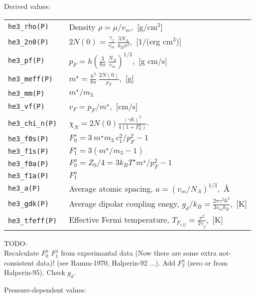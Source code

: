 \documentclass[a4paper]{article}
\begin{document}
Derived values:

\medskip
\noindent\begin{tabular}{lp{11cm}}
\tt he3\_rho(P)    & Density $\rho = \mu/v_m$,~[g/cm$^3$]\\
\tt he3\_2n0(P)    & $\displaystyle 2N(0) = \frac{\gamma_f}{v_m}
                     \ \frac{3 N_A}{k_B \pi^2}$,~[1/(erg cm$^3$)]\\[3mm]
\tt he3\_pf(P)     & $\displaystyle p_F = h \left(\frac{3}{8\pi}
                     \ \frac{N_A}{v_m}\right)^{1/3}$,~[g cm/s]\\[3mm]
\tt he3\_meff(P)   & $\displaystyle m^\star = \frac{h^3}{8\pi}
                     \ \frac{2N(0)}{p_F}$,~[g]\\[3mm]
\tt he3\_mm(P)     &$m^\star/m_3$\\
\tt he3\_vf(P)     &$\displaystyle v_F = p_F/m^\star$,~[cm/s]\\
\tt he3\_chi\_n(P) &$\displaystyle \chi_{N} =
                     2N(0) \frac{(\gamma\hbar)^2}{4(1 + F_0^a)}$.\\[3mm]
\tt he3\_f0s(P)    &$\displaystyle F_0^s = 3\ m^\star m_3\ c_1^2 / p_F^2 - 1$\\
\tt he3\_f1s(P)    &$\displaystyle F_1^s = 3(m^\star/m_3 - 1)$\\
\tt he3\_f0a(P)    &$\displaystyle F_0^a = Z_0/4 = 3 k_B T^\star m^\star / p_F^2 - 1$\\
\tt he3\_f1a(P)    &$\displaystyle F_1^a$\\

\tt he3\_a(P)      &Average atomic spacing,
                    $\displaystyle a=(v_m/N_A)^{1/3}$,~\AA\\
\tt he3\_gdk(P)    &Average dipolar coupling enegy,
                    $\displaystyle g_d/k_B = \frac{2\pi\gamma^2\hbar^2}{3 v_m k_B}$,~[K]\\
\tt he3\_tfeff(P)  &Effective Fermi temperature,
                    $\displaystyle T_{F_{eff}} = \frac{\pi^2}{2\gamma_f}$,~[K]\\
\end{tabular}
\medskip

\noindent TODO:\\
Recalculate $F_0^a$ $F_1^a$ from experimantal data (Now there are some extra
not-consistent data)!
(see Ramm-1970, Halperin-92 ...). Add $F_2^a$ (zero or from Halperin-95).
Check $g_d$.

\eject
Pressure-dependent values:
\medskip
\end{document}
